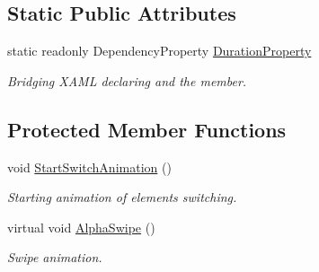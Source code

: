 \subsection*{Static Public Attributes}
\begin{DoxyCompactItemize}
\item 
static readonly Dependency\+Property \mbox{\hyperlink{class_wpf_handler_1_1_u_i_1_1_controls_1_1_switch_panel_ad636f8069ad5c1869073781451f6ba2a}{Duration\+Property}}
\begin{DoxyCompactList}\small\item\em Bridging X\+A\+ML declaring and the member. \end{DoxyCompactList}\end{DoxyCompactItemize}
\subsection*{Protected Member Functions}
\begin{DoxyCompactItemize}
\item 
void \mbox{\hyperlink{class_wpf_handler_1_1_u_i_1_1_controls_1_1_switch_panel_a2227b95066799ff4d9b0431c97513643}{Start\+Switch\+Animation}} ()
\begin{DoxyCompactList}\small\item\em Starting animation of elements switching. \end{DoxyCompactList}\item 
virtual void \mbox{\hyperlink{class_wpf_handler_1_1_u_i_1_1_controls_1_1_switch_panel_af0469b4bed6e5d1e34a677427f45051a}{Alpha\+Swipe}} ()
\begin{DoxyCompactList}\small\item\em Swipe animation. \end{DoxyCompactList}\end{DoxyCompactItemize}
